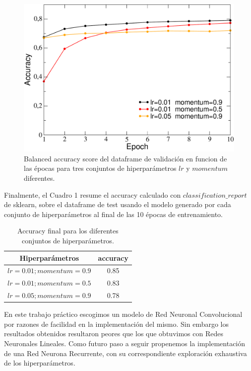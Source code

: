 \documentclass[a4paper,10pt]{article}
\begin{document}
\begin{figure}[h]
\centering
\includegraphics[scale=0.35]{data/accuracy-conv.pdf}
\caption{Balanced accuracy score del dataframe de validación en funcion de las épocas para tres conjuntos de hiperparámetros $lr$ y $momentum$ diferentes.}
\label{fig02}
\end{figure}


Finalmente, el Cuadro 1 resume el accuracy calculado con $classification\_report$ de sklearn, sobre el dataframe de test usando el modelo generado por cada conjunto de hiperparámetros al final de las 10 épocas de entrenamiento.
\begin{table}[h]
\caption{Accuracy final para los diferentes conjuntos de hiperparámetros.}\label{tab:data}
\begin{tabular}{cc}
\hline
Hiperparámetros  & accuracy \\
\hline
\hline
$lr=0.01; momentum=0.9$ &  0.85\\
$lr=0.01; momentum=0.5$ &  0.83\\
$lr=0.05; momentum=0.9$ &  0.78
\end{tabular}
\end{table}

En este trabajo práctico escogimos un modelo de Red Neuronal Convolucional por razones de facilidad en la implementación del mismo. Sin embargo los resultados obtenidos resultaron peores que los que obtuvimos con Redes Neuronales Lineales. Como futuro paso a seguir propenemos la implementación de una Red Neurona Recurrente, con su correspondiente exploración exhaustiva de los hiperparámetros.
\end{document}
